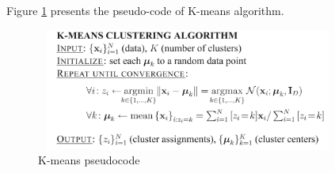 \documentclass[../UNBThesis2.tex]{subfiles}
\begin{document}
 
Figure \ref{kmAlgo} presents the pseudo-code of K-means algorithm.

\begin{figure}
\centering
\includegraphics[width = 10cm,height = 4cm]{image/Chapters/Chapter2/6.png}
\caption{K-means pseudocode }
\label{kmAlgo}
\end{figure}





\end{document}
